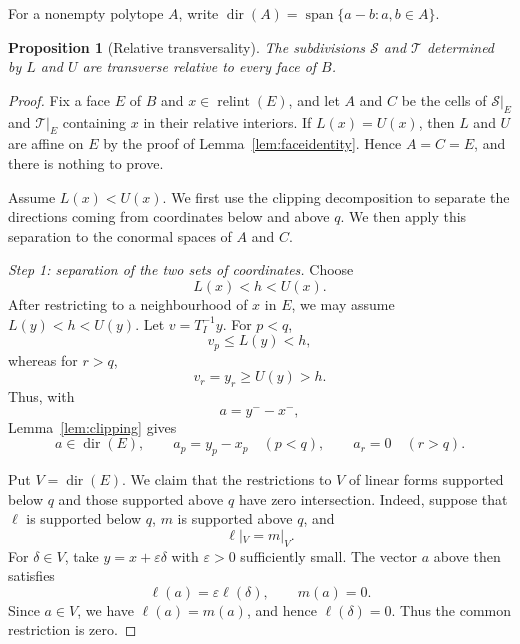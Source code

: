 \documentclass[a4paper,12pt]{amsart}
\newtheorem{proposition}[theorem]{Proposition}
\theoremstyle{definition}
\theoremstyle{remark}
\newcommand{\relint}{\operatorname{relint}}
\newcommand{\dir}{\operatorname{dir}}
\begin{document}
For a nonempty polytope $A$, write $\dir(A)=\operatorname{span}\{a-b:a,b\in A\}$.

\begin{proposition}[Relative transversality]\label{prop:transversality}
The subdivisions $\mathcal S$ and $\mathcal T$ determined by $L$ and $U$ are transverse relative to every face of $B$.
\end{proposition}

\begin{proof}
Fix a face $E$ of $B$ and $x\in\relint(E)$, and let $A$ and $C$ be the cells of $\mathcal S|_E$ and $\mathcal T|_E$ containing $x$ in their relative interiors.
If $L(x)=U(x)$, then $L$ and $U$ are affine on $E$ by the proof of Lemma~\ref{lem:faceidentity}.
Hence $A=C=E$, and there is nothing to prove.

Assume $L(x)<U(x)$.
We first use the clipping decomposition to separate the directions coming from coordinates below and above $q$.
We then apply this separation to the conormal spaces of $A$ and $C$.

\smallskip
\noindent\emph{Step 1: separation of the two sets of coordinates.}
Choose
\[
 L(x)<h<U(x).
\]
After restricting to a neighbourhood of $x$ in $E$, we may assume $L(y)<h<U(y)$.
Let $v=T_I^{-1}y$.
For $p<q$,
\[
 v_p\leq L(y)<h,
\]
whereas for $r>q$,
\[
 v_r=y_r\geq U(y)>h.
\]
Thus, with
\[
 a=y^- -x^-,
\]
Lemma~\ref{lem:clipping} gives
\[
 a\in\dir(E),\qquad  a_p=y_p-x_p\quad(p<q),\qquad  a_r=0\quad(r>q).
\]

Put $V=\dir(E)$.
We claim that the restrictions to $V$ of linear forms supported below $q$ and those supported above $q$ have zero intersection.
Indeed, suppose that $\ell$ is supported below $q$, $m$ is supported above $q$, and
\[
 \ell|_V=m|_V.
\]
For $\delta\in V$, take $y=x+\varepsilon\delta$ with $\varepsilon>0$ sufficiently small.
The vector $a$ above then satisfies
\[
 \ell(a)=\varepsilon\ell(\delta),  \qquad
 m(a)=0.
\]
Since $a\in V$, we have $\ell(a)=m(a)$, and hence $\ell(\delta)=0$.
Thus the common restriction is zero.


\end{proof}
\end{document}
